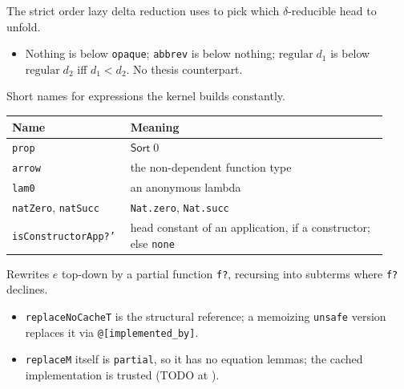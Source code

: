 \begin{definition}
\label{def:kernel-reducibility-lt}
\leanok
{} The strict order lazy delta reduction uses to pick which $\delta$-reducible head
to unfold.
\begin{itemize}
\item Nothing is below \texttt{opaque}; \texttt{abbrev} is below nothing; $\mathrm{regular}\;d_1$
is below $\mathrm{regular}\;d_2$ iff $d_1 < d_2$. No thesis counterpart.
\end{itemize}
\end{definition}

\begin{definition}
\label{family:kernel-expr-helpers}
\leanok
{} Short names for expressions the kernel builds constantly.
\par\smallskip\noindent
\begin{tabular}{p{0.27\linewidth}p{0.66\linewidth}}
\toprule
Name & Meaning \\
\midrule
\texttt{prop} & $\mathsf{Sort}\;0$ \\
\texttt{arrow} & the non-dependent function type \\
\texttt{lam0} & an anonymous lambda \\
\texttt{natZero}, \texttt{natSucc} & \texttt{Nat.zero}, \texttt{Nat.succ} \\
\texttt{isConstructorApp?'} & head constant of an application, if a constructor; else
\texttt{none} \\
\bottomrule
\end{tabular}\par\smallskip
\end{definition}

\begin{definition}
\label{def:kernel-expr-replace}
\leanok
{} Rewrites $e$ top-down by a partial function \texttt{f?}, recursing into subterms
where \texttt{f?} declines.
\begin{itemize}
\item \texttt{replaceNoCacheT} is the structural reference; a memoizing \texttt{unsafe} version
replaces it via \texttt{@[implemented\_by]}.
\item {} \texttt{replaceM} itself is \texttt{partial}, so it has no equation lemmas; the
cached implementation is trusted (TODO at ).
\end{itemize}
\end{definition}

